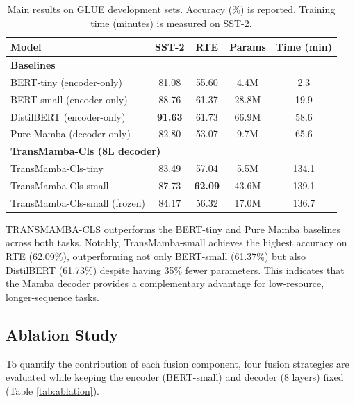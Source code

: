 \documentclass[10pt, conference]{IEEEtran}
\begin{document}
\begin{table}[htbp]
\caption{Main results on GLUE development sets. Accuracy (\%) is reported. Training time (minutes) is measured on SST-2.} %
\label{tab:main_results}
\centering
\begin{tabular}{lcccc}
\toprule
\textbf{Model} & \textbf{SST-2} & \textbf{RTE} & \textbf{Params} & \textbf{Time (min)} \\ %
\midrule
\multicolumn{5}{l}{\textbf{Baselines}} \\ %
BERT-tiny (encoder-only) & 81.08 & 55.60 & 4.4M & 2.3 \\ %
BERT-small (encoder-only) & 88.76 & 61.37 & 28.8M & 19.9 \\ %
DistilBERT (encoder-only) & \textbf{91.63} & 61.73 & 66.9M & 58.6 \\ %
Pure Mamba (decoder-only) & 82.80 & 53.07 & 9.7M & 65.6 \\ %
\midrule
\multicolumn{5}{l}{\textbf{TransMamba-Cls (8L decoder)}} \\ %
TransMamba-Cls-tiny & 83.49 & 57.04 & 5.5M & 134.1 \\ %
TransMamba-Cls-small & 87.73 & \textbf{62.09} & 43.6M & 139.1 \\ %
TransMamba-Cls-small (frozen) & 84.17 & 56.32 & 17.0M & 136.7 \\ %
\bottomrule
\end{tabular}
\end{table}

TRANSMAMBA-CLS outperforms the BERT-tiny and Pure Mamba baselines across both tasks. %
Notably, TransMamba-small achieves the highest accuracy on RTE (62.09\%), outperforming not only BERT-small (61.37\%) but also DistilBERT (61.73\%) despite having 35\% fewer parameters. %
This indicates that the Mamba decoder provides a complementary advantage for low-resource, longer-sequence tasks. %

\subsection{Ablation Study} %
To quantify the contribution of each fusion component, four fusion strategies are evaluated while keeping the encoder (BERT-small) and decoder (8 layers) fixed (Table \ref{tab:ablation}). %
\end{document}
